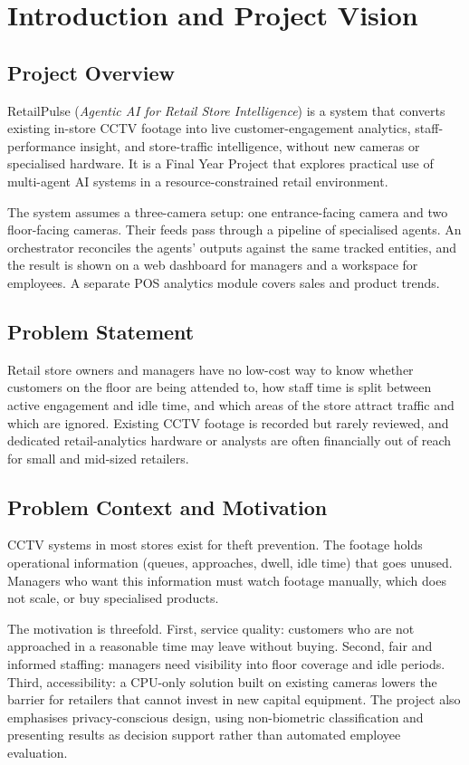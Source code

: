 \chapter{Introduction and Project Vision}
\label{ch:intro}
\section{Project Overview}
RetailPulse (\textit{Agentic AI for Retail Store Intelligence}) is a system that converts existing in-store CCTV footage into live customer-engagement analytics, staff-performance insight, and store-traffic intelligence, without new cameras or specialised hardware. It is a Final Year Project that explores practical use of multi-agent AI systems in a resource-constrained retail environment.

The system assumes a three-camera setup: one entrance-facing camera and two floor-facing cameras. Their feeds pass through a pipeline of specialised agents. An orchestrator reconciles the agents' outputs against the same tracked entities, and the result is shown on a web dashboard for managers and a workspace for employees. A separate POS analytics module covers sales and product trends.

\section{Problem Statement}
Retail store owners and managers have no low-cost way to know whether customers on the floor are being attended to, how staff time is split between active engagement and idle time, and which areas of the store attract traffic and which are ignored. Existing CCTV footage is recorded but rarely reviewed, and dedicated retail-analytics hardware or analysts are often financially out of reach for small and mid-sized retailers.

\section{Problem Context and Motivation}
CCTV systems in most stores exist for theft prevention. The footage holds operational information (queues, approaches, dwell, idle time) that goes unused. Managers who want this information must watch footage manually, which does not scale, or buy specialised products.

The motivation is threefold. First, service quality: customers who are not approached in a reasonable time may leave without buying. Second, fair and informed staffing: managers need visibility into floor coverage and idle periods. Third, accessibility: a CPU-only solution built on existing cameras lowers the barrier for retailers that cannot invest in new capital equipment. The project also emphasises privacy-conscious design, using non-biometric classification and presenting results as decision support rather than automated employee evaluation.

